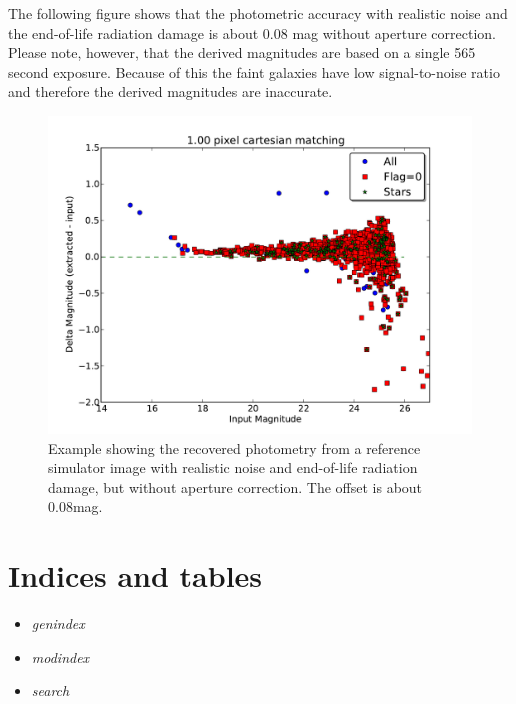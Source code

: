 \documentclass[a4paper,12pt,english]{sphinxmanual}
\begin{document}
The following
figure shows that the photometric accuracy with realistic noise and the end-of-life radiation damage is
about 0.08 mag without aperture correction. Please note, however, that the derived magnitudes are based on a
single 565 second exposure. Because of this the faint galaxies have low signal-to-noise ratio and therefore
the derived magnitudes are inaccurate.
\begin{figure}[htbp]
\centering
\capstart

\includegraphics{Magnitudes15.pdf}
\caption{Example showing the recovered photometry from a reference simulator image with realistic noise
and end-of-life radiation damage, but without aperture correction. The offset is about 0.08mag.}\end{figure}


\chapter{Indices and tables}
\label{index:indices-and-tables}\begin{itemize}
\item {} 
\emph{genindex}

\item {} 
\emph{modindex}

\item {} 
\emph{search}

\end{itemize}
\end{document}
